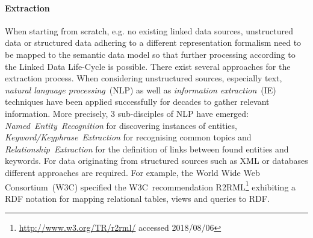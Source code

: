 \paragraph{Extraction} When starting from scratch, e.g. no existing linked data sources, unstructured data or structured data adhering to a different
representation formalism need to be mapped to the semantic data model so that further processing according to the Linked Data Life-Cycle is possible. 
There exist several approaches for the extraction process. When considering unstructured sources, especially text, \emph{natural language processing}~(NLP) as well as \emph{information extraction}~(IE) techniques have been applied successfully for decades to gather relevant information. More precisely, 3 sub-disciples of NLP have emerged: \emph{Named~Entity~Recognition} for discovering instances of entities, \emph{Keyword/Keyphrase~Extraction} for recognising common topics and \emph{Relationship~Extraction} for the definition of links between found entities and keywords. For data originating from structured sources such as XML or databases different approaches are required. For example, the World Wide Web Consortium~(W3C) specified the W3C~recommendation R2RML\footnote{\url{http://www.w3.org/TR/r2rml/} accessed 2018/08/06} exhibiting a RDF notation for mapping relational tables, views and queries to RDF. 

